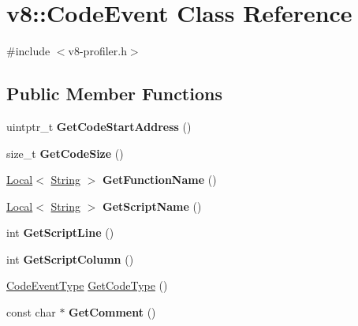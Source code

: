 \hypertarget{classv8_1_1CodeEvent}{}\section{v8\+:\+:Code\+Event Class Reference}
\label{classv8_1_1CodeEvent}


{\ttfamily \#include $<$v8-\/profiler.\+h$>$}

\subsection*{Public Member Functions}
\begin{DoxyCompactItemize}
\item 
\mbox{\label{classv8_1_1CodeEvent_a4018eb2ab6907598649cde071c3e02b7}} 
uintptr\+\_\+t {\bfseries Get\+Code\+Start\+Address} ()
\item 
\mbox{\label{classv8_1_1CodeEvent_ad0804f7a64f8bb1545204d6f4ca3d19b}} 
size\+\_\+t {\bfseries Get\+Code\+Size} ()
\item 
\mbox{\label{classv8_1_1CodeEvent_afe5fecc317811cfa507e37e001475ecc}} 
\mbox{\hyperlink{classv8_1_1Local}{Local}}$<$ \mbox{\hyperlink{classv8_1_1String}{String}} $>$ {\bfseries Get\+Function\+Name} ()
\item 
\mbox{\label{classv8_1_1CodeEvent_a7314ce97c31a879d935bc34f2669c43f}} 
\mbox{\hyperlink{classv8_1_1Local}{Local}}$<$ \mbox{\hyperlink{classv8_1_1String}{String}} $>$ {\bfseries Get\+Script\+Name} ()
\item 
\mbox{\label{classv8_1_1CodeEvent_afb712b7e49428996ca2dbe56d0beaead}} 
int {\bfseries Get\+Script\+Line} ()
\item 
\mbox{\label{classv8_1_1CodeEvent_af24375d6cf1cf4f959f2458796f9d9dd}} 
int {\bfseries Get\+Script\+Column} ()
\item 
\mbox{\hyperlink{namespacev8_af0ff31131cc32ced9b5279b321569bbc}{Code\+Event\+Type}} \mbox{\hyperlink{classv8_1_1CodeEvent_a3a6507024df2e1e0898c03bc35bbd293}{Get\+Code\+Type}} ()
\item 
\mbox{\label{classv8_1_1CodeEvent_aae2fde2ba771dffec1884aaa985b13ab}} 
const char $\ast$ {\bfseries Get\+Comment} ()
\end{DoxyCompactItemize}

